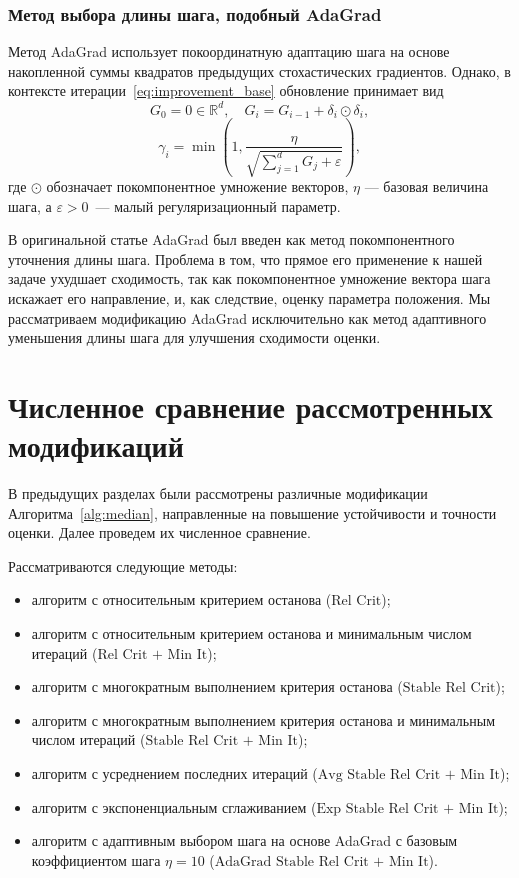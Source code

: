 \subsubsection{Метод выбора длины шага, подобный AdaGrad}

Метод AdaGrad \cite{duchi2011adaptive} использует покоординатную адаптацию шага на основе накопленной суммы квадратов предыдущих стохастических градиентов. Однако, в контексте итерации~\eqref{eq:improvement_base} обновление принимает вид
\[
G_0 = 0 \in \mathbb{R}^d, \quad G_i = G_{i-1} + \delta_i \odot \delta_i,
\]
\[
\gamma_i = \min\left(1, \frac{\eta}{\sqrt{\sum_{j=1}^d G_j + \varepsilon}}\right),
\]
где $\odot$ обозначает покомпонентное умножение векторов, $\eta$ --- базовая величина шага, а $\varepsilon > 0$~--- малый регуляризационный параметр.

В оригинальной статье \cite{duchi2011adaptive} AdaGrad был введен как метод покомпонентного уточнения длины шага. Проблема в том, что прямое его применение к нашей задаче ухудшает сходимость, так как покомпонентное умножение вектора шага искажает его направление, и, как следствие, оценку параметра положения. Мы рассматриваем модификацию AdaGrad исключительно как метод адаптивного уменьшения длины шага для улучшения сходимости оценки.

\section{Численное сравнение рассмотренных модификаций}

В предыдущих разделах были рассмотрены различные модификации Алгоритма~\ref{alg:median}, направленные на повышение устойчивости и точности оценки. Далее проведем их численное сравнение.

Рассматриваются следующие методы:
\begin{itemize}
    \item алгоритм с относительным критерием останова ($\text{Rel Crit}$);
    
    \item алгоритм с относительным критерием останова и минимальным числом итераций ($\text{Rel Crit + Min It}$);
    
    \item алгоритм с многократным выполнением критерия останова ($\text{Stable Rel Crit}$);
    
    \item алгоритм с многократным выполнением критерия останова и минимальным числом итераций ($\text{Stable Rel Crit + Min It}$);
    
    \item алгоритм с усреднением последних итераций ($\text{Avg Stable Rel Crit + Min It}$);
    
    \item алгоритм с экспоненциальным сглаживанием ($\text{Exp Stable Rel Crit + Min It}$);
    
    \item алгоритм с адаптивным выбором шага на основе AdaGrad с базовым коэффициентом шага $\eta = 10$  ($\text{AdaGrad Stable Rel Crit + Min It}$).
\end{itemize}


